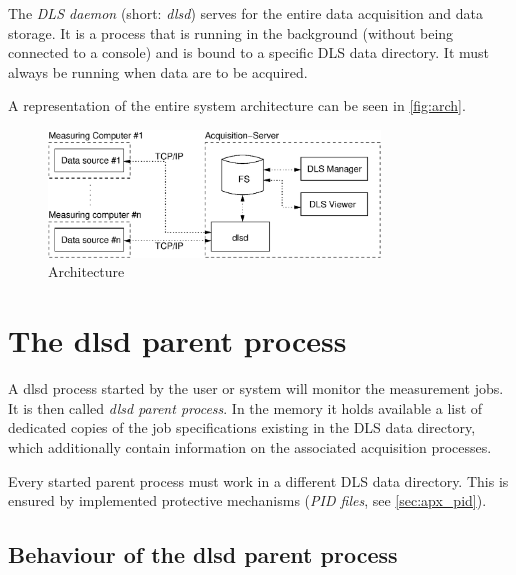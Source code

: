 \documentclass[a4paper,12pt,BCOR6mm,bibtotoc,idxtotoc]{scrbook}
\begin{document}
The \textit{DLS daemon} (short: \textit{dlsd}) serves for the entire data
acquisition and data storage. It is a process that is running in
the background (without being connected to a console) and is bound to a
specific DLS data directory. It must always be
running when data are to be acquired.

A representation of the entire system architecture can be
seen in \autoref{fig:arch}.

\begin{figure}[htb] \begin{center} \includegraphics[width=250pt]{bilder/arch_en} \end{center} \caption{Architecture} \label{fig:arch} \end{figure}


\section{The dlsd parent process}
\label{sec:dlsd_mother}

A dlsd process started by the user or system will monitor the measurement
jobs. It is then called \textit{dlsd parent process}.
In the memory it holds available a list of dedicated copies of the job
specifications existing in the DLS data directory, which additionally contain
information on the associated acquisition processes.

Every started parent process must work in a different DLS data
directory. This is ensured by implemented protective
mechanisms (\textit{PID files}, see \autoref{sec:apx_pid}).


\subsection{Behaviour of the dlsd parent process}
\label{sec:dlsd_mother_behaviour}
\end{document}
